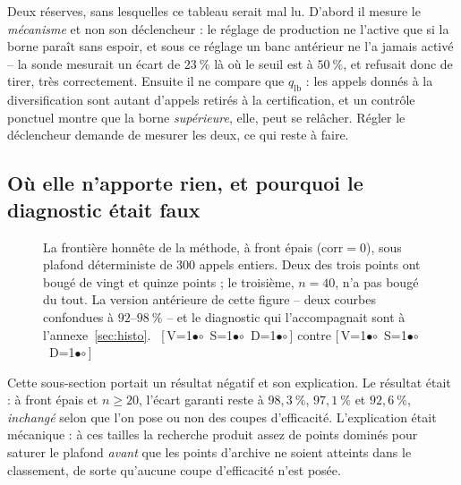 \documentclass[11pt,a4paper]{article}
\theoremstyle{plain}
\theoremstyle{remark}
\newcommand{\cfgm}[1]{\ifnum#1=1$\bullet$\else$\circ$\fi}
\newcommand{\conf}[3]{%
  \textsf{\footnotesize[\,V\cfgm{#1}\ S\cfgm{#2}\ D\cfgm{#3}\,]}}
\begin{document}
Deux réserves, sans lesquelles ce tableau serait mal lu. D'abord il mesure
le \emph{mécanisme} et non son déclencheur : le réglage de production ne
l'active que si la borne paraît sans espoir, et sous ce réglage un banc
antérieur ne l'a jamais activé -- la sonde mesurait un écart de $23\ \%$ là
où le seuil est à $50\ \%$, et refusait donc de tirer, très correctement.
Ensuite il ne compare que $q_{\text{lb}}$ : les appels donnés à la
diversification sont autant d'appels retirés à la certification, et un
contrôle ponctuel montre que la borne \emph{supérieure}, elle, peut se
relâcher. Régler le déclencheur demande de mesurer les deux, ce qui reste à
faire.

\subsection{Où elle n'apporte rien, et pourquoi le diagnostic était faux}
\label{sec:echellehonnete}

\begin{figure}[H]
\centering
{}
\caption{La frontière honnête de la méthode, à front épais
($\text{corr}=0$), sous plafond déterministe de $300$ appels entiers. Deux
des trois points ont bougé de vingt et quinze points ; le troisième, $n=40$,
n'a pas bougé du tout. La version antérieure de cette figure -- deux courbes
confondues à $92$--$98\ \%$ -- et le diagnostic qui l'accompagnait sont à
l'annexe~\ref{sec:histo}.\ \conf{0}{0}{0} contre \conf{1}{1}{1}}
\label{fig:echelle}
\end{figure}

Cette sous-section portait un résultat négatif et son explication. Le
résultat était : à front épais et $n\ge 20$, l'écart garanti reste à
$98{,}3\ \%$, $97{,}1\ \%$ et $92{,}6\ \%$, \emph{inchangé} selon que l'on
pose ou non des coupes d'efficacité. L'explication était mécanique : à ces
tailles la recherche produit assez de points dominés pour saturer le
plafond \emph{avant} que les points d'archive ne soient atteints dans le
classement, de sorte qu'aucune coupe d'efficacité n'est posée.
\end{document}
